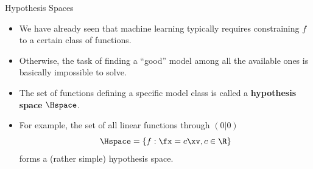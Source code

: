 \documentclass[11pt,compress,t,notes=noshow, xcolor=table]{beamer}
\begin{document}

\begin{vbframe}{Hypothesis Spaces}

\begin{itemize}

  \item We have already seen that machine learning typically requires 
  constraining $f$ to a certain class of functions.
  
  \item Otherwise, the task of finding a \enquote{good} model among all the
  available ones is basically impossible to solve.
  
  \item The set of functions defining a specific model class is called a 
  \textbf{hypothesis space} $\Hspace$.
  
  \item For example, the set of all linear functions through $(0|0)$
  $$\Hspace = \{f: \fx = c \xv, c \in \R\}$$
  forms a (rather simple) hypothesis space.

\end{itemize}  

\end{vbframe}

\end{document}
